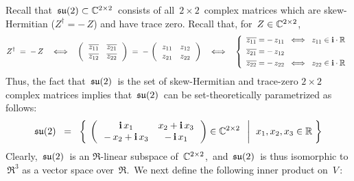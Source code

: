 \vskip 0.3cm
\noindent
Recall that \,$\mathfrak{su}(2) \subset \mathbb{C}^{2 \times 2}$\, consists of all \,$2 \times 2$\, complex matrices
which are {\color{red}skew-Hermitian} ($Z^{\dagger} = -\,Z$) and have {\color{red}trace zero}.
Recall that, for \,$Z \in \mathbb{C}^{2 \times 2}$,\,
\begin{equation*}
Z^{\dagger} \; = \; - \, Z
\quad\Longleftrightarrow\quad
\left(\,\begin{array}{cc}
	\overline{z_{11}} & \overline{z_{21}}
	\\
	\overline{z_{12}} & \overline{z_{22}}
	\end{array}\,\right)
\; = \;
-\,\left(\,\begin{array}{cc}
	z_{11} & z_{12}
	\\
	z_{21} & z_{22}
	\end{array}\,\right)
\quad\Longleftrightarrow\quad
\left\{\begin{array}{l}
	\overline{z_{11}} = - \, z_{11} \;\;\Longleftrightarrow\;\; z_{11} \in \i\cdot\Re
	\\
	\overline{z_{21}} \overset{{\color{white}1}}{=} - \, z_{12}
	\\
	\overline{z_{22}} \overset{{\color{white}1}}{=} - \, z_{22} \;\;\Longleftrightarrow\;\; z_{22} \in \i\cdot\Re
	\end{array}\right.
\end{equation*}
Thus, the fact that \,$\mathfrak{su}(2)$\, is the set of skew-Hermitian and trace-zero $2 \times 2$ complex matrices
implies that \,$\mathfrak{su}(2)$\, can be set-theoretically parametrized as follows:
\begin{equation*}
\mathfrak{su}(2)
\;\; = \;\;
	\left\{\;\left.
		\left(\,\begin{array}{cc}
			\textnormal{\bf i}\,x_{1} & x_{2} + \textnormal{\bf i}\,x_{3}
			\\
			- \, x_{2} + \textnormal{\bf i}\,x_{3} & -\,\textnormal{\bf i}\,x_{1}
			\end{array}\,\right)
		\in \mathbb{C}^{2 \times 2}
		\;\;\,\right\vert\;\,
		x_{1}, x_{2}, x_{3} \in \mathbb{R}
		\;\right\}
\end{equation*}
Clearly, \,$\mathfrak{su}(2)$\, is an $\Re$-linear subspace of \,$\mathbb{C}^{2 \times 2}$,\,
and \,$\mathfrak{su}(2)$\, is thus isomorphic to \,$\Re^{3}$ as a vector space over \,$\Re$.\,
We next define the following inner product on \,$V$\,:
